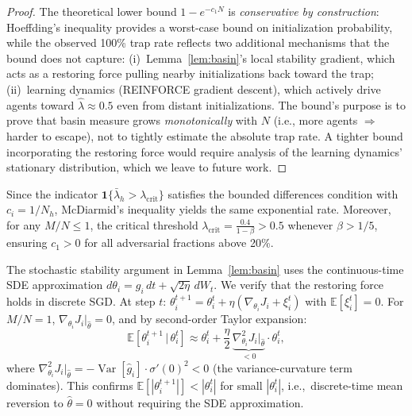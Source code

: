 \begin{proof}
The theoretical lower bound $1 - e^{-c_1 N}$ is \emph{conservative by construction}: Hoeffding's inequality provides a worst-case bound on initialization probability, while the observed 100\% trap rate reflects two additional mechanisms that the bound does not capture: (i)~Lemma~\ref{lem:basin}'s local stability gradient, which acts as a restoring force pulling nearby initializations back toward the trap; (ii)~learning dynamics (REINFORCE gradient descent), which actively drive agents toward $\hat\lambda \approx 0.5$ even from distant initializations. The bound's purpose is to prove that basin measure grows \emph{monotonically} with $N$ (i.e., more agents $\Rightarrow$ harder to escape), not to tightly estimate the absolute trap rate. A tighter bound incorporating the restoring force would require analysis of the learning dynamics' stationary distribution, which we leave to future work.
\end{proof}

\begin{corollary}
\label{cor:mcdiarmid}
Since the indicator $\mathbf{1}\{\bar{\lambda}_h > \lambda_{\mathrm{crit}}\}$
satisfies the bounded differences condition with $c_i = 1/N_h$,
McDiarmid's inequality yields the same exponential rate.
Moreover, for any $M/N \leq 1$, the critical threshold
$\lambda_{\mathrm{crit}} = \frac{0.4}{1-\beta} > 0.5$
whenever $\beta > 1/5$, ensuring $c_1 > 0$ for all
adversarial fractions above 20\%.
\end{corollary}


\begin{remark}
\label{rem:discrete_time}
The stochastic stability argument in Lemma~\ref{lem:basin} uses the
continuous-time SDE approximation
$d\theta_i = g_i \, dt + \sqrt{2\eta} \, dW_t$.
We verify that the restoring force holds in discrete SGD.
At step $t$:
$\theta_i^{t+1} = \theta_i^t + \eta (\nabla_{\theta_i} J_i + \xi_i^t)$
with $\mathbb{E}[\xi_i^t] = 0$.
For $M/N = 1$, $\nabla_{\theta_i} J_i|_{\hat\theta} = 0$, and by
second-order Taylor expansion:
\[
  \mathbb{E}[\theta_i^{t+1} \,|\, \theta_i^t]
  \approx \theta_i^t + \frac{\eta}{2}\,
  \underbrace{\nabla^2_{\theta_i} J_i\big|_{\hat\theta}}_{\displaystyle < 0}
  \cdot \theta_i^t,
\]
where $\nabla^2_{\theta_i} J_i|_{\hat\theta}
= -\operatorname{Var}[\hat{g}_i] \cdot \sigma'(0)^2 < 0$
(the variance-curvature term dominates).
This confirms $\mathbb{E}[|\theta_i^{t+1}|] < |\theta_i^t|$
for small $|\theta_i^t|$, i.e.,\ discrete-time mean reversion
to $\hat\theta = 0$ without requiring the SDE approximation.
\end{remark}

